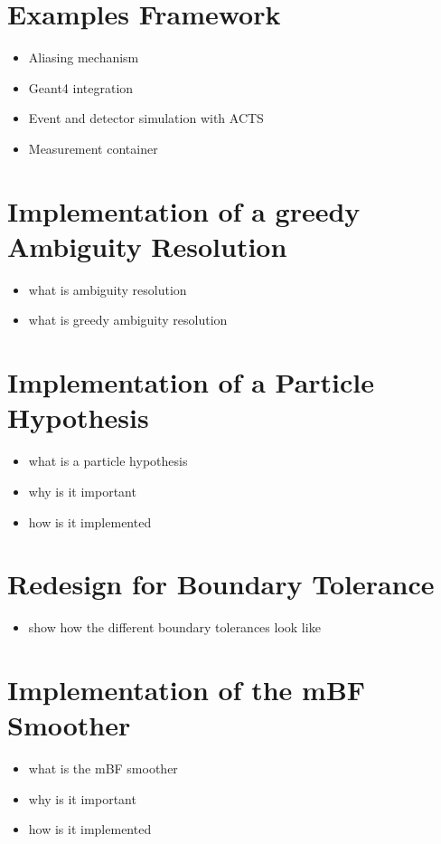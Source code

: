 \section{Examples Framework}

\begin{itemize}
    \color{red}
    \item Aliasing mechanism
    \item Geant4 integration
    \item Event and detector simulation with ACTS
    \item Measurement container
\end{itemize}

\section{Implementation of a greedy Ambiguity Resolution}

\begin{itemize}
    \color{red}
    \item what is ambiguity resolution
    \item what is greedy ambiguity resolution
\end{itemize}

\section{Implementation of a Particle Hypothesis}

\begin{itemize}
    \color{red}
    \item what is a particle hypothesis
    \item why is it important
    \item how is it implemented
\end{itemize}

\section{Redesign for Boundary Tolerance}

\begin{itemize}
    \color{red}
    \item show how the different boundary tolerances look like
\end{itemize}

\section{Implementation of the mBF Smoother}

\begin{itemize}
    \color{red}
    \item what is the mBF smoother
    \item why is it important
    \item how is it implemented
\end{itemize}

